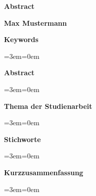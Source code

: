 {
\thispagestyle{empty}

\newenvironment{indentText}{%
  \par%
  \leftskip=3em\rightskip=0em%
  \noindent\ignorespaces}{%
  \par\medskip}


{\LARGE\bfseries\raggedleft Abstract}
\bigskip
\normalsize

{\bfseries\raggedleft Max Mustermann}
\bigskip

{\bfseries\raggedleft Keywords}
\begin{indentText}
\lipsum*[1]

\end{indentText}
{\bfseries\raggedleft Abstract}
\begin{indentText}
\lipsum*[1]
\end{indentText}

\bigskip\bigskip

{\bfseries\raggedleft Thema der Studienarbeit}
\begin{indentText}
\end{indentText}

{\bfseries\raggedleft Stichworte}
\begin{indentText}
\end{indentText}

{\bfseries\raggedleft Kurzzusammenfassung}
\begin{indentText}
\end{indentText}
}
